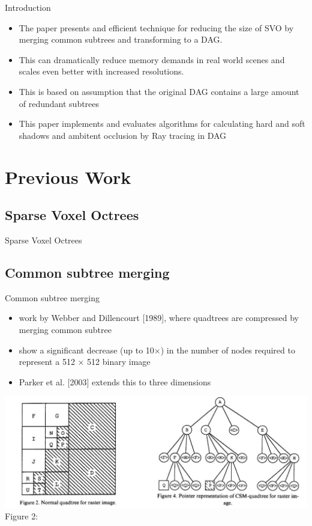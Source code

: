 \documentclass{beamer}
\begin{document}
\begin{frame}{Introduction}
  \begin{itemize}
  \item {
  		The paper presents and efficient technique for reducing the size of SVO by merging common subtrees and transforming to a DAG.
    }
    \item{
    	This can dramatically reduce memory demands in real world scenes and scales even better with increased resolutions.
    }
    \item{
    	This is based on assumption that the original DAG contains a large amount of redundant subtrees
    }
    \item{
    	This paper implements and evaluates algorithms for calculating hard and soft shadows and ambitent occlusion by Ray tracing in DAG 
    }
 
  \end{itemize}
 
\end{frame}

\section{Previous Work}
\subsection{Sparse Voxel Octrees}
\begin{frame}{Sparse Voxel Octrees}
\end{frame}

\subsection{Common subtree merging}
\begin{frame}{Common subtree merging}
\begin{itemize}
	\item work by Webber and Dillencourt [1989], where quadtrees  are compressed by merging common subtree
	\item show a significant decrease (up to 10×) in the
number of nodes required to represent a 512 × 512 binary image
	\item Parker et al. [2003] extends this to three dimensions
\end{itemize}
\includegraphics[scale=0.3]{images/CSM.jpg}{ Figure 2:}
\end{frame}
\end{document}
